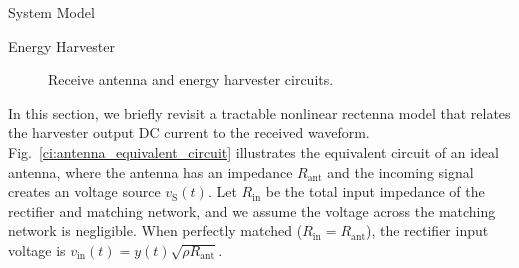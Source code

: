 \documentclass[journal]{IEEEtran}
\begin{document}
\begin{section}{System Model}
		\begin{subsection}{Energy Harvester}
			\begin{figure}[!t]
				\centering
				\noindent
				\begin{minipage}[b]{0.5\linewidth}
					\centering
				\end{minipage}%
				\begin{minipage}[b]{0.5\linewidth}
					\centering
				\end{minipage}
				\caption{Receive antenna and energy harvester circuits.}
			\end{figure}

			In this section, we briefly revisit a tractable nonlinear rectenna model that relates the harvester output DC current to the received waveform. Fig.~\ref{ci:antenna_equivalent_circuit} illustrates the equivalent circuit of an ideal antenna, where the antenna has an impedance $R_{\text{ant}}$ and the incoming signal creates an voltage source $v_{\text{S}}(t)$. Let $R_{\text{in}}$ be the total input impedance of the rectifier and matching network, and we assume the voltage across the matching network is negligible. When perfectly matched ($R_{\text{in}}=R_{\text{ant}}$), the rectifier input voltage is $v_{\text{in}}(t)=y(t)\sqrt{\rho R_{\text{ant}}}$.


\end{subsection}
\end{section}
\end{document}
